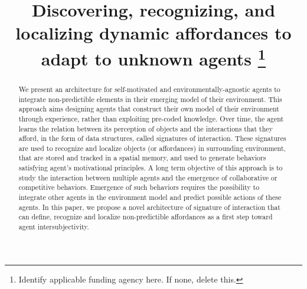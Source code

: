 \documentclass[conference]{IEEEtran}
\begin{document}
\title{%
Discovering, recognizing, and localizing dynamic affordances to adapt to unknown agents
\thanks{Identify applicable funding agency here. If none, delete this.}
}

\author{
\and
{}
\and
{}
}

\maketitle

\begin{abstract}
We present an architecture for self-motivated and environmentally-agnostic agents to integrate non-predictible elements in their emerging model of their environment. This approach aims designing agents that construct their own model of their environment through experience, rather than exploiting pre-coded knowledge. Over time, the agent learns the relation between its perception of objects and the interactions that they afford, in the form of data structures, called signatures of interaction. These signatures are used to recognize and localize objects (or affordances) in surrounding environment, that are stored and tracked in a spatial memory, and used to generate behaviors satisfying agent's motivational principles. A long term objective of this approach is to study the interaction between multiple agents and the emergence of collaborative or competitive behaviors. Emergence of such behaviors requires the possibility to integrate other agents in the environment model and predict possible actions of these agents. In this paper, we propose a novel architecture of signature of interaction that can define, recognize and localize non-predictible affordances as a first step toward agent intersubjectivity.
\end{abstract}
\end{document}
